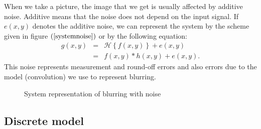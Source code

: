 When we take a picture, the image that we get is usually affected by additive noise. Additive means that the noise does not depend on the input signal. If $e(x,y)$ denotes the additive noise, we can represent the system by the scheme  given in figure $(\ref{systemnoise})$ or by the following equation:
\begin{eqnarray}
g(x,y) &=& \mathcal{H}\left\lbrace f(x,y) \right\rbrace + e(x,y) \\
 &=& f(x,y) \ast h(x,y) + e(x,y).
\label{generaleq}
\end{eqnarray}
This noise represents measurement and round-off errors and also errors due to the model (convolution) we use to represent blurring.

\begin{figure}
\begin{center}
\end{center}
\caption{System representation of blurring with noise}
\label{systemnoise}
\end{figure}


\subsection{Discrete model}

